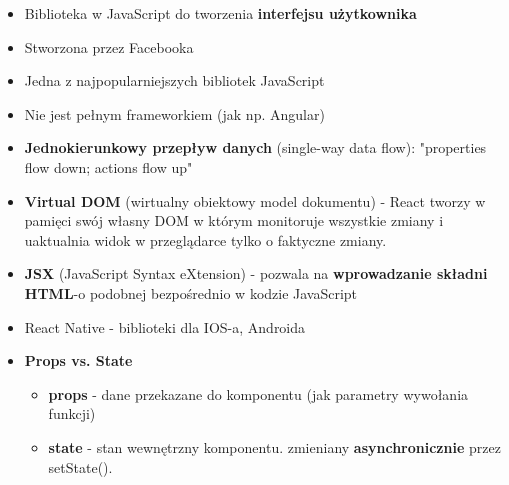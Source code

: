 \documentclass[../main.tex]{subfiles}
\begin{document}
    \begin{itemize}
        \item Biblioteka w JavaScript do tworzenia \textbf{interfejsu użytkownika}
        \item Stworzona przez Facebooka
        \item Jedna z najpopularniejszych bibliotek JavaScript
        \item Nie jest pełnym frameworkiem (jak np. Angular)\\

        \item \textbf{Jednokierunkowy przepływ danych} (single-way data flow): "properties flow down; actions flow up"
        \item \textbf{Virtual DOM} (wirtualny obiektowy model dokumentu) - React tworzy w pamięci swój własny DOM w którym monitoruje
        wszystkie zmiany i uaktualnia widok w przeglądarce tylko o faktyczne zmiany.
        \item \textbf{JSX} (JavaScript Syntax eXtension) - pozwala na \textbf{wprowadzanie składni HTML}-o podobnej bezpośrednio w kodzie JavaScript
        \item React Native - biblioteki dla IOS-a, Androida
        \item \textbf{Props vs. State}
        \begin{itemize}
            \item \textbf{props} - dane przekazane do komponentu (jak parametry wywołania funkcji)
            \item \textbf{state} - stan wewnętrzny komponentu. zmieniany \textbf{asynchronicznie} przez setState().
        \end{itemize}
    \end{itemize}
\end{document}
